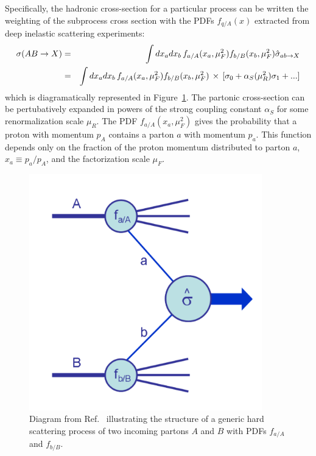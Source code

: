 Specifically, the hadronic cross-section for a particular process can be written the weighting of the subprocess cross section with the PDFs $f_{q/A}(x)$ extracted from deep inelastic scattering experiments\cite{Campbell:2006wx}:
\begin{eqnarray}
\sigma(AB\rightarrow X) &=& \int dx_a dx_b \,f_{a/A}(x_a,\mu_F^2) f_{b/B}(x_b,\mu_F^2) \hat{\sigma}_{ab \rightarrow X} \nonumber \\
&=& \int dx_a dx_b \,f_{a/A}(x_a,\mu_F^2) f_{b/B}(x_b,\mu_F^2) \,\times\,[\sigma_0 + \alpha_{S}(\mu_R^2)\sigma_1 + ...]
\end{eqnarray}
which is diagramatically represented in Figure~\ref{fig:factorize}. The partonic cross-section can be pertubatively expanded in powers of the strong coupling constant $\alpha_S$ for some renormalization scale $\mu_R$. The PDF $f_{a/A}(x_a,\mu_F^2)$ gives the probability that a proton with momentum $p_A$ contains a parton $a$ with momentum $p_a$. This function depends only on the fraction of the proton momentum distributed to parton $a$, $x_a \equiv p_a/p_A$, and the factorization scale $\mu_F$. 
\begin{figure}[h]
\includegraphics[width=0.9\textwidth]{fig/thry/Factorize.pdf}
\caption{Diagram from Ref.~\cite{Campbell:2006wx} illustrating the structure of a generic hard scattering process of two incoming partons $A$ and $B$ with PDFs $f_{a/A}$ and $f_{b/B}$.}
\label{fig:factorize}
\end{figure}

